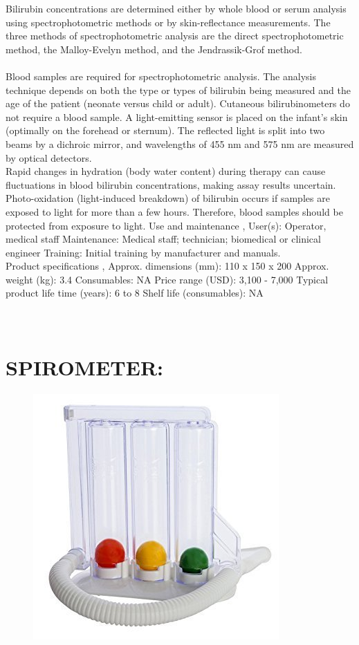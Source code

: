 \documentclass[a4paper,12pt]{article}
\begin{document}
 Bilirubin concentrations are determined either by whole blood or serum analysis using spectrophotometric methods or by skin-reflectance measurements. The three methods of spectrophotometric analysis are the direct spectrophotometric method, the Malloy-Evelyn method, and the Jendrassik-Grof method.
 \\
 \\
 
 Blood samples are required for spectrophotometric analysis. The analysis technique depends on both the type or types of bilirubin being measured and the age of the patient (neonate versus child or adult). Cutaneous bilirubinometers do not require a blood sample. A light-emitting sensor is placed on the infant’s skin (optimally on the forehead or sternum). The reflected light is split into two beams by a dichroic mirror, and wavelengths of 455 nm and 575 nm are measured by optical detectors.
 \\
  
 Rapid changes in hydration (body water content) during therapy can cause fluctuations in blood bilirubin concentrations, making assay results uncertain. Photo-oxidation (light-induced breakdown) of bilirubin occurs if samples are exposed to light for more than a few hours. Therefore, blood samples should be protected from exposure to light.
Use and maintenance ,
User(s): Operator, medical staff
Maintenance: Medical staff; technician;
biomedical or clinical engineer
Training: Initial training by manufacturer and
manuals.
\\
 
Product specifications ,
Approx. dimensions (mm): 110 x 150 x 200
Approx. weight (kg): 3.4
Consumables: NA
Price range (USD): 3,100 - 7,000
Typical product life time (years): 6 to 8
Shelf life (consumables): NA
\\
\\
\\
 
\section{SPIROMETER:}

\begin{figure}[h]
\includegraphics[scale=0.4]{spi.jpg}
\end{figure}
\end{document}
